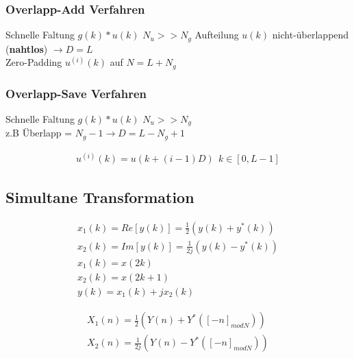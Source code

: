\documentclass[10pt,a4paper]{article}
\begin{document}
  \subsubsection{Overlapp-Add Verfahren}
  Schnelle Faltung $g(k)*u(k)$ $N_u >> N_g$ 
  Aufteilung $u(k)$ nicht-überlappend (\textbf{nahtlos}) $\rightarrow D=L$ \\
  Zero-Padding $u^{(i)}(k)$ auf $N=L+N_g$ 
  \subsubsection{Overlapp-Save Verfahren}
  Schnelle Faltung $g(k)*u(k)$ $N_u >> N_g$ \\
  z.B Überlapp = $N_g-1 \rightarrow D=L-N_g+1$ \\
  \begin{mdframed}[style=exercise]
    \begin{align}
        u^{(i)}(k) = u(k+(i-1)D) \ \ k\in[0,L-1]
    \end{align}
  \end{mdframed}
  \subsection{Simultane Transformation}
  \begin{mdframed}[style=exercise]
    \begin{align}
        x_1(k) = Re[y(k)] = \frac{1}{2}(y(k)+y^*(k))\\
        x_2(k) = Im[y(k)] = \frac{1}{2j}(y(k)-y^*(k))\\
        x_1(k) = x(2k)\\
        x_2(k) = x(2k+1)\\
        y(k) = x_1(k) +jx_2(k)
    \end{align}
  \end{mdframed}
  \begin{mdframed}[style=exercise]
    \begin{align}
        X_1(n) = \frac{1}{2}(Y(n)+Y^*([-n]_{modN}))\\
        X_2(n) = \frac{1}{2j}(Y(n)-Y^*([-n]_{modN}))
    \end{align}
  \end{mdframed}

\end{document}
